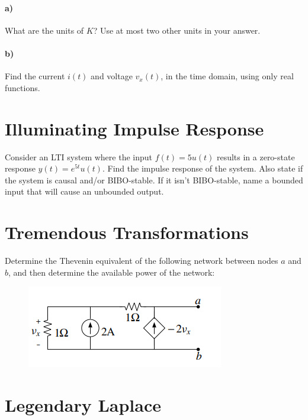 \documentclass{article}
\begin{document}
\paragraph{a)} What are the units of $K$? Use at most two other units in your answer.

\paragraph{b)} Find the current $i(t)$ and voltage $v_x(t)$, in the time domain, using only real functions.

\vfill

\section{Illuminating Impulse Response}

Consider an LTI system where the input $f(t) = 5u(t)$ results in a zero-state response $y(t) = e^{5t}u(t)$. Find the impulse response of the system. Also state if the system is causal and/or BIBO-stable. If it isn't BIBO-stable, name a bounded input that will cause an unbounded output.

\vfill
\newpage


\section{Tremendous Transformations}

Determine the Thevenin equivalent of the following network between nodes $a$ and $b$, and then determine the available power of the network:

\begin{figure}[h]
\begin{center}
    \includegraphics[width=0.5 
    \textwidth]{figures/qqqq.PNG}
\end{center}
\end{figure}

\vfill

\section{Legendary Laplace}
\end{document}
